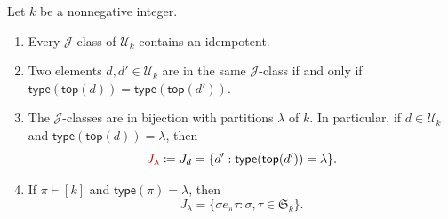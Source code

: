 \documentclass[ALCO,Unicode]{cedram}
\newcommand{\defncolor}{\color{darkred}}
\begin{document}
\begin{prop}\label{prop:charJclass}
Let $k$ be a nonnegative integer. 
\begin{enumerate}[label=(\alph*)]
    \item \label{35a}Every $\mathscr{J}$-class of $\mathcal{U}_k$ contains an idempotent. 
    \item\label{35b} Two elements $d, d' \in \mathcal{U}_k$ are in the same $\mathscr{J}$-class if and only if $\mathsf{type}(\mathsf{top}(d)) = \mathsf{type}(\mathsf{top}(d'))$.
    \item\label{35c} The $\mathscr{J}$-classes are in bijection with partitions $\lambda$ of $k$. In particular, if $d\in \mathcal{U}_k$ and 
    $\mathsf{type}(\mathsf{top}(d)) = \lambda$, then 
    \[ {\defncolor J_\lambda} \coloneqq J_d = \{ d' : \mathsf{type}(\mathsf{top}(d')) = \lambda\}. \]
    \item\label{35d} If $\pi\vdash [k]$ and $\mathsf{type}(\pi) = \lambda$, then 
    \[ J_{\lambda} = \{\sigma e_\pi \tau : \sigma, \tau\in \mathfrak{S}_k\}.\]
\end{enumerate}
\end{prop}
\end{document}
